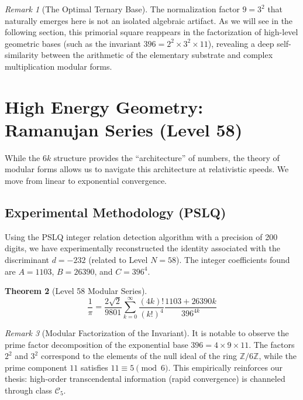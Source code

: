 \documentclass[12pt, a4paper]{article}
\theoremstyle{plain}
\newtheorem{theorem}{Theorem}[section]
\theoremstyle{definition}
\theoremstyle{remark}
\newtheorem{remark}[theorem]{Remark}
\numberwithin{equation}{section}
\begin{document}
\begin{remark}[The Optimal Ternary Base]
The normalization factor $9 = 3^2$ that naturally emerges here is not an isolated algebraic artifact. As we will see in the following section, this primorial square reappears in the factorization of high-level geometric bases (such as the invariant $396 = 2^2 \times 3^2 \times 11$), revealing a deep self-similarity between the arithmetic of the elementary substrate and complex multiplication modular forms.
\end{remark}
\section{High Energy Geometry: Ramanujan Series (Level 58)}

While the $6k$ structure provides the ``architecture'' of numbers, the theory of modular forms allows us to navigate this architecture at relativistic speeds. We move from linear to exponential convergence.

\subsection{Experimental Methodology (PSLQ)}
Using the PSLQ integer relation detection algorithm with a precision of 200 digits, we have experimentally reconstructed the identity associated with the discriminant $d = -232$ (related to Level $N=58$). The integer coefficients found are $A=1103$, $B=26390$, and $C=396^4$.

\begin{theorem}[Level 58 Modular Series]
\begin{equation}
\frac{1}{\pi} = \frac{2\sqrt{2}}{9801} \sum_{k=0}^{\infty} \frac{(4k)!}{(k!)^4} \frac{1103 + 26390k}{396^{4k}}
\end{equation}
\end{theorem}

\begin{remark}[Modular Factorization of the Invariant]
It is notable to observe the prime factor decomposition of the exponential base $396 = 4 \times 9 \times 11$. The factors $2^2$ and $3^2$ correspond to the elements of the null ideal of the ring $\mathbb{Z}/6\mathbb{Z}$, while the prime component $11$ satisfies $11 \equiv 5 \pmod 6$. This empirically reinforces our thesis: high-order transcendental information (rapid convergence) is channeled through class $\mathcal{C}_5$.
\end{remark}
\end{document}
